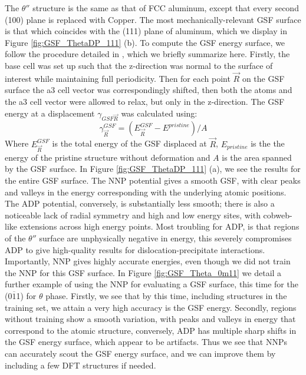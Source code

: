 \documentclass{article}
\begin{document}
The $\theta''$ structure is the same as that of FCC aluminum, except that every second (100) plane is replaced with Copper.
The most mechanically-relevant GSF surface is that which coincides with the (111) plane of aluminum, which we display in Figure \ref{fig:GSF_ThetaDP_111} (b).
To compute the GSF energy surface, we follow the procedure detailed in \cite{Yin2017a}, which we briefly summarize here.
Firstly, the base cell was set up such that the z-direction was normal to the surface of interest while maintaining full periodicity.
Then for each point $\vec{R}$ on the GSF surface the a3  cell vector was correspondingly shifted,
then both the atoms and the a3 cell vector were allowed to relax, but only in the z-direction.
The GSF energy at a displacement $\gamma_{GSF\vec{R}}$ was calculated using: 
\begin{equation}
\gamma^{GSF}_{\vec{R}} = (E^{GSF}_{\vec{R}} - E^{pristine})/A
\end{equation}
Where $E^{GSF}_{\vec{R}}$ is the total energy of the GSF displaced at $\vec{R}$, $E_{pristine}$ is the 
the energy of the pristine structure without deformation and $A$ is the area spanned by the GSF surface.
In Figure \ref{fig:GSF_ThetaDP_111} (a), we see the results for the entire GSF surface.
The NNP potential gives a smooth GSF, with clear peaks and valleys in the energy corresponding with the underlying atomic positions.
The ADP potential, conversely, is substantially less smooth; there is also a noticeable lack of radial symmetry and high and low energy sites,  with cobweb-like extensions across high energy points.
Most troubling for ADP, is that regions of the $\theta''$ surface are unphysically negative in energy, this severely compromises ADP to give high-quality results for dislocation-precipitate interactions.
Importantly, NNP gives highly accurate energies, even though we did not train the NNP for this GSF surface.
In Figure \ref{fig:GSF_Theta_0m11} we detail a further example of using the NNP for evaluating a GSF surface, this time for the (0$\overline{1}$1) for $\theta$ phase. 
Firstly, we see that by this time, including structures in the training set, we attain a very high accuracy is the GSF energy. 
Secondly, regions without training show a smooth variation, with peaks and valleys in energy that correspond to the atomic structure, conversely, ADP has multiple sharp shifts in the GSF energy surface, which appear to be artifacts.  Thus we see that NNPs can accurately scout the GSF energy surface, and we can improve them by including a few DFT structures if needed. 
\end{document}
